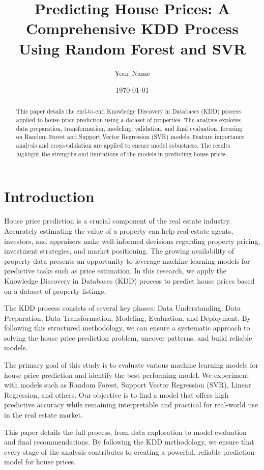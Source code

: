 \documentclass{article}
\title{Predicting House Prices: A Comprehensive KDD Process Using Random Forest and SVR}
\author{Your Name}
\date{\today}
\begin{document}
\maketitle

\begin{abstract}
This paper details the end-to-end Knowledge Discovery in Databases (KDD) process applied to house price prediction using a dataset of properties. The analysis explores data preparation, transformation, modeling, validation, and final evaluation, focusing on Random Forest and Support Vector Regression (SVR) models. Feature importance analysis and cross-validation are applied to ensure model robustness. The results highlight the strengths and limitations of the models in predicting house prices.
\end{abstract}

\section{Introduction}
House price prediction is a crucial component of the real estate industry. Accurately estimating the value of a property can help real estate agents, investors, and appraisers make well-informed decisions regarding property pricing, investment strategies, and market positioning. The growing availability of property data presents an opportunity to leverage machine learning models for predictive tasks such as price estimation. In this research, we apply the Knowledge Discovery in Databases (KDD) process to predict house prices based on a dataset of property listings.

The KDD process consists of several key phases: Data Understanding, Data Preparation, Data Transformation, Modeling, Evaluation, and Deployment. By following this structured methodology, we can ensure a systematic approach to solving the house price prediction problem, uncover patterns, and build reliable models.

The primary goal of this study is to evaluate various machine learning models for house price prediction and identify the best-performing model. We experiment with models such as Random Forest, Support Vector Regression (SVR), Linear Regression, and others. Our objective is to find a model that offers high predictive accuracy while remaining interpretable and practical for real-world use in the real estate market.

This paper details the full process, from data exploration to model evaluation and final recommendations. By following the KDD methodology, we ensure that every stage of the analysis contributes to creating a powerful, reliable prediction model for house prices.
\end{document}
